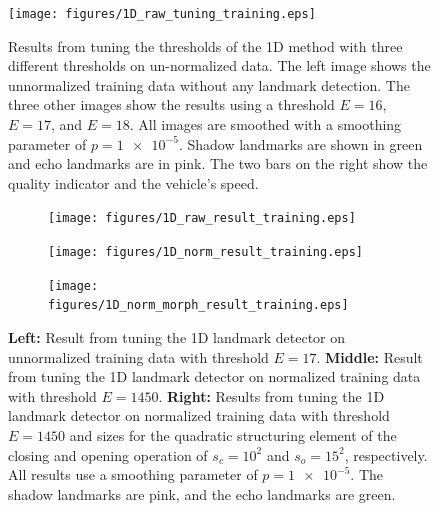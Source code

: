 \begin{figure}  %
  \centering
  \texttt{[image: figures/1D\_raw\_tuning\_training.eps]}
  \caption[Results of tuning threshold of the 1D method]{Results from tuning the thresholds of the 1D method with three different thresholds on un-normalized data. The left image shows the unnormalized training data without any landmark detection. The three other images show the results using a threshold $E = 16$, $E = 17$, and $E = 18$. All images are smoothed with a smoothing parameter of $p = \num{1e-5}$. Shadow landmarks are shown in green and echo landmarks are in pink. The two bars on the right show the quality indicator and the vehicle's speed.}
  \label{fig:1D_raw_tuning_training}
\end{figure}

\begin{figure}[ht]%
     \centering
    \begin{subfigure}[t]{0.3051\textwidth}
         \centering
         \texttt{[image: figures/1D\_raw\_result\_training.eps]}
     \end{subfigure}
     \hspace{0cm}
     \begin{subfigure}[t]{0.2493\textwidth}
         \centering
         \texttt{[image: figures/1D\_norm\_result\_training.eps]}
     \end{subfigure}
     \hspace{0cm}
     \begin{subfigure}[t]{0.3339\textwidth}
         \centering
         \texttt{[image: figures/1D\_norm\_morph\_result\_training.eps]}
     \end{subfigure}
        \caption{\textbf{Left:} Result from tuning the 1D landmark detector on unnormalized training data with threshold $E = 17$. \textbf{Middle:} Result from tuning the 1D landmark detector on normalized training data with threshold $E = 1450$. \textbf{Right:} Results from tuning the 1D landmark detector on normalized training data with threshold $E = 1450$ and sizes for the quadratic structuring element of the closing and opening operation of $s_c = 10^2$ and $s_o = 15^2$, respectively. All results use a smoothing parameter of $p = \num{1e-5}$. The shadow landmarks are pink, and the echo landmarks are green.}
        \label{fig:1D_tuning_results}
\end{figure}

